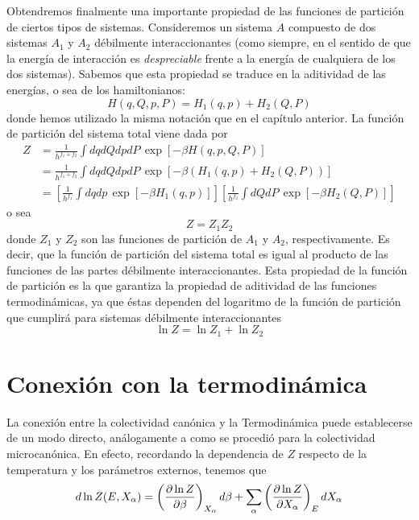 Obtendremos finalmente una importante propiedad de las funciones de partición de ciertos tipos de sistemas.
Consideremos un sistema $A$ compuesto de dos sistemas $A_1$ y $A_2$ débilmente interaccionantes (como siempre, en el sentido de que la energía de interacción es \emph{despreciable} frente a la energía de cualquiera de los dos sistemas).
Sabemos que esta propiedad se traduce en la aditividad de las energías, o sea de los hamiltonianos:
\begin{equation}
	H(q,Q,p,P) = H_1(q,p) + H_2(Q,P)
\end{equation}
donde hemos utilizado la misma notación que en el capítulo anterior.
La función de partición del sistema total viene dada por
\begin{align}
	Z &= \frac{1}{h^{f_1+f_2}} \int dqdQdpdP \, \exp \left[ -\beta H(q,p,Q,P) \right] \nonumber \\
	  &= \frac{1}{h^{f_1+f_2}} \int dqdQdpdP \, \exp \left[ -\beta  (H_1(q,p) + H_2(Q,P)) \right] \\
	  &= \left[ \frac{1}{h^{f_1}} \int dqdp \, \exp \left[ -\beta H_1(q,p) \right]\right]  \left[ \frac{1}{h^{f_2}} \int dQdP \, \exp \left[ -\beta H_2(Q,P) \right] \right] \nonumber
\end{align}
o sea
\begin{equation}
	\boxed{Z = Z_1 Z_2}
\end{equation}
donde $Z_1$ y $Z_2$ son las funciones de partición de $A_1$ y $A_2$, respectivamente.
Es decir, que la función de partición del sistema total es igual al producto de las funciones de las partes débilmente interaccionantes.
Esta propiedad de la función de partición es la que garantiza la propiedad de aditividad de las funciones termodinámicas, ya que éstas dependen del logaritmo de la función de partición que cumplirá para sistemas débilmente interaccionantes
\begin{equation}
	\ln Z = \ln Z_1 + \ln Z_2
\end{equation}

\section{Conexión con la termodinámica}

La conexión entre la colectividad canónica y la Termodinámica puede establecerse de un modo directo, análogamente a como se procedió para la colectividad microcanónica.
En efecto, recordando la dependencia de $Z$ respecto de la temperatura y los parámetros externos, tenemos que
\begin{equation}
	d\ln Z(E,X_\alpha) = \left( \pdv{\ln Z}{\beta} \right)_{X_\alpha} d\beta + \sum_{\alpha} \left( \pdv{\ln Z}{X_\alpha} \right)_{E} dX_\alpha
\end{equation}

